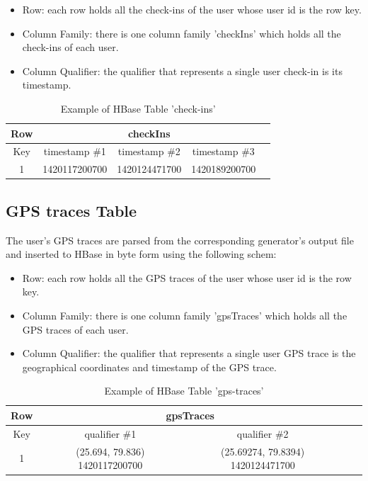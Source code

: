 \begin{itemize}
 \item Row: each row holds all the check-ins of the user whose user id is the row key.
 \item Column Family: there is one column family 'checkIns' which holds all the check-ins of each user.
 \item Column Qualifier: the qualifier that represents a single user check-in is its timestamp.
\end{itemize}

\begin{table}[H]
\begin{center}
\begin{tabular}{|c|c|c|c|c|}
 \hline
 Row & \multicolumn{3}{|c|}{checkIns} \\
 \hline
 Key & timestamp \#1 & timestamp \#2 & timestamp \#3 \\
 \hline
 1 & 1420117200700 & 1420124471700 & 1420189200700 \\ \hline 
\end{tabular}
\end{center}
\caption{Example of HBase Table 'check-ins'}
\end{table}

\subsection{GPS traces Table}

The user's GPS traces are parsed from the corresponding generator's output file and inserted to HBase in byte form using the following schem:

\begin{itemize}
 \item Row: each row holds all the GPS traces of the user whose user id is the row key.
 \item Column Family: there is one column family 'gpsTraces' which holds all the GPS traces of each user.
 \item Column Qualifier: the qualifier that represents a single user GPS trace is the geographical coordinates and timestamp of the GPS trace.
\end{itemize}

\begin{table}[H]
\begin{center}
\begin{tabular}{|c|c|c|c|c|}
 \hline
 Row & \multicolumn{2}{|c|}{gpsTraces} \\
 \hline
 Key & qualifier \#1 & qualifier \#2\\
 \hline
 1 & (25.694, 79.836) 1420117200700 & (25.69274, 79.8394) 1420124471700 \\ \hline 
\end{tabular}
\end{center}
\caption{Example of HBase Table 'gps-traces'}
\end{table}

